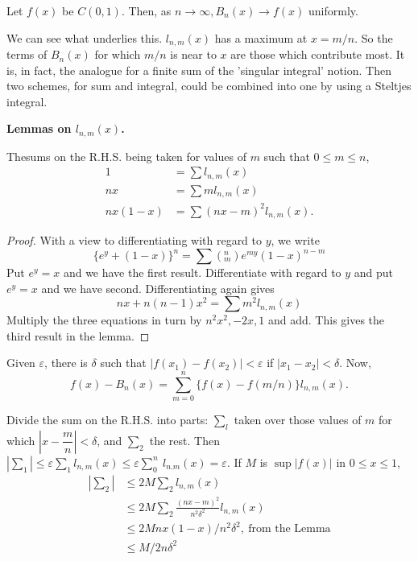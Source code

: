 \begin{theorem}\label{chap1:sec3:thm3} %
  Let $f (x)$ be $C (0,  1) $.  Then, as  $ n \to  \infty,  B_n
    (x) \to f (x) $ uniformly.  
\end{theorem}

\begin{note*}
  We can see what underlies this. $ l_{n,  m} (x) $ has a maximum at
  $ x = m/n $. So the terms of $ B_n (x) $  for which $ m / n $ is
  near to $x$ are  those which contribute most. It is, in fact, the
  analogue for a finite sum of the 'singular integral' notion. Then
  two schemes, for sum and integral, could be combined into one by
  using a Steltjes integral. 
\end{note*}

\noindent
\textbf{Lemmas on $l_{n,m} (x) $.}

The\pageoriginale sums on the R.H.S. being taken for values of $m$ such that $ 0
\leq m \leq n $, 
\begin{align*}
  1 &=  \sum l_{n,m} (x) \\
  nx &= \sum m l_{n,m} (x) \\
  nx (1-x) & = \sum (nx-m)^2 l_{n,m} (x).
\end{align*}

\begin{proof}
  With a view to differentiating with regard to $y$, we write 
  $$
  \big \{e^y + (1-x) \big \}^n  = \sum  (^n_m) e^{my} (1 -x)^{n-m}
  $$
  Put $ e^y = x $ and we have  the first result. Differentiate with
  regard to  $y$ and put $ e^y = x $ and we have
  second. Differentiating again gives  
  $$
  nx + n (n - 1) x^2  = \sum m^2 l_{n,m} (x)
  $$
  Multiply the three equations in turn by $n^2 x^2, - 2x,1$ and
  add. This gives the third result in the lemma. 
\end{proof}

\begin{proofoftheorem}\label{chap1:sec3:pofthm3}
  Given $ \varepsilon $, there is $ \delta $ such that $ | f (x_1) - f
  (x_2) | < \varepsilon $ if $ | x_1 - x_2 | < \delta $. Now, 
  $$
  f (x) - B_n (x) = \sum^{n}_{m=0} \big \{f (x) - f (m/n) \big \}  l_{n,m} (x).
  $$
\end{proofoftheorem}

Divide the sum on the  R.H.S. into parts:  $\sum_l$ taken over those
values of $m$  for which $ | x - \dfrac{m}{n} | < \delta$, and $
\sum_2 $ the rest. Then $ | \sum_1 | \leq \varepsilon \sum_1  l_{n,m}
(x) \leq \varepsilon \sum \limits^{n}_{0}~ l_{n.m} (x) = \varepsilon
$. If $ M $ is  $ \sup | f (x) | $ in $ 0 \leq x \leq 1$, 
\begin{align*}
  | \sum_2 | &\leq 2 M \sum_2 l_{n,m} (x) \\
  &\leq 2 M \sum_2 \frac{(nx - m)^2}{n^2 \delta^2} l_{n,m} (x) \\
  &\leq 2 M nx (1-x) / n^2 \delta^2,  ~\text{from the Lemma} \\
  &\leq M/ 2n \delta^2
\end{align*}

